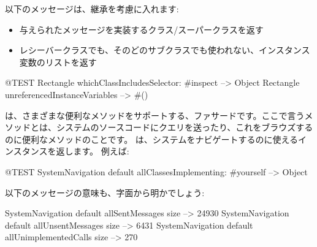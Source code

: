 \documentclass[a4paper,10pt,twoside]{book}
\begin{document}
以下のメッセージは、継承を考慮に入れます:
\begin{itemize}
\item {} 与えられたメッセージを実装するクラス/スーパークラスを返す
\item {}レシーバークラスでも、そのどのサブクラスでも使われない、インスタンス変数のリストを返す
\end{itemize}

\begin{code}{@TEST}
Rectangle whichClassIncludesSelector: #inspect --> Object
Rectangle unreferencedInstanceVariables            --> #()
\end{code}

は、さまざまな便利なメソッドをサポートする、ファサードです。ここで言うメソッドとは、システムのソースコードにクエリを送ったり、これをブラウズするのに便利なメソッドのことです。
 は、システムをナビゲートするのに使えるインスタンスを返します。
例えば:

\begin{code}{@TEST}
SystemNavigation default allClassesImplementing: #yourself --> {Object}
\end{code}

以下のメッセージの意味も、字面から明かでしょう:

\begin{code}{}
SystemNavigation default allSentMessages size          --> 24930
SystemNavigation default allUnsentMessages size      --> 6431
SystemNavigation default allUnimplementedCalls size --> 270
\end{code}
\end{document}
